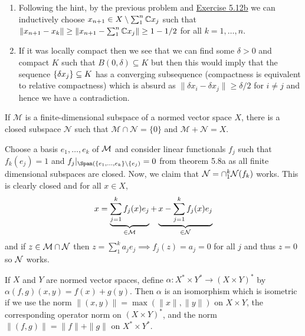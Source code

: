 \documentclass[12pt,a4paper]{article}
\begin{document}
\begin{solution}
\begin{enumerate}[label=\alph*.]
    \item Following the hint, by the previous problem and \hyperref[prob:5-12]{Exercise 5.12b} we can inductively choose $x_{n+1}\in X\setminus\sum_1^n\mathbb{C} x_j$ such that $\|x_{n+1}-x_k\|\geq\|x_{n+1}-\sum_1^n\mathbb{C} x_j\|\geq 1-1/2$ for all $k=1,\ldots,n$. 
    \item If it was locally compact then we see that we can find some $\delta>0$ and compact $K$ such that $B(0,\delta) \subseteq K$ but then this would imply that the sequence $ \qty{\delta x_j} \subseteq K$ has a converging subsequence (compactness is equivalent to relative compactness) which is absurd as $\|\delta x_i-\delta x_j\|\geq\delta/2$ for $i\neq j$ and hence we have  a contradiction. 
\end{enumerate}
\end{solution}
\begin{problem}\label{prob:5-20}
If $\mathcal{M}$ is a finite-dimensional subspace of a normed vector space $X$, there is a closed subspace $\mathcal{N}$ such that $\mathcal{M} \cap \mathcal{N} = \{0\}$ and $\mathcal{M} + \mathcal{N} = X$.
\end{problem}
\begin{solution}
    Choose a basis $e_1,\ldots,e_k$ of $\mathcal{M}$ and consider linear functionals $f_j$ such that $f_k(e_j)=1$ and $f_j|_{\Span(\{e_1,\ldots,e_k\}\setminus\{e_j)}=0$ from theorem 5.8a as all finite dimensional subspaces are closed. 
    Now, we claim that $\mathcal{N}=\cap_1^k\mathcal{N}(f_k)$ works. 
    This is clearly closed and for all $x\in X$, 
    \[
        x=\underbrace{\sum_{j=1}^kf_j(x)e_j}_{\in\mathcal{M}}+\underbrace{x-\sum_{j=1}^kf_j(x)e_j}_{\in\mathcal{N}}
    \]
    and if $z\in\mathcal{M}\cap\mathcal{N}$ then $z=\sum_1^ka_je_j\implies f_j(z)=a_j=0$ for all $j$ and thus $z=0$ so $\mathcal{N}$ works. 
\end{solution}
\begin{problem}\label{prob:5-21}
If $X$ and $Y$ are normed vector spaces, define $\alpha : X^* \times Y^* \rightarrow (X \times Y)^*$ by $\alpha(f,g)(x,y) = f(x) + g(y)$. Then $\alpha$ is an isomorphism which is isometric if we use the norm $\|(x,y)\| = \max(\|x\|, \|y\|)$ on $X \times Y$, the corresponding operator norm on $(X \times Y)^*$, and the norm $\|(f,g)\| = \|f\| + \|g\|$ on $X^* \times Y^*$.
\end{problem}
\end{document}
